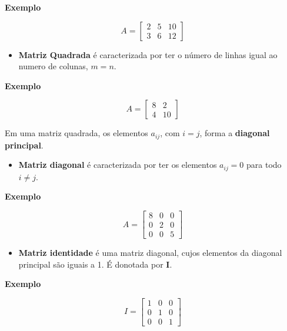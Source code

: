 \documentclass[
]{book}
\providecommand{\tightlist}{%
  \setlength{\itemsep}{0pt}\setlength{\parskip}{0pt}}
\begin{document}
\textbf{Exemplo}

\begin{equation*}
A = 
\begin{bmatrix}
2 & 5 & 10 \\
3 & 6 & 12
\end{bmatrix}
\end{equation*}

\begin{itemize}
\tightlist
\item
  \textbf{Matriz Quadrada} é caracterizada por ter o número de linhas igual ao numero de colunas, \(m = n\).
\end{itemize}

\textbf{Exemplo}

\begin{equation*}
A = 
\begin{bmatrix}
8 & 2 \\
4 & 10
\end{bmatrix}
\end{equation*}

Em uma matriz quadrada, os elementos \(a_{ij}\), com \(i = j\), forma a \textbf{diagonal principal}.

\begin{itemize}
\tightlist
\item
  \textbf{Matriz diagonal} é caracterizada por ter os elementos \(a_{ij} = 0\) para todo \(i \neq j\).
\end{itemize}

\textbf{Exemplo}

\begin{equation*}
A = 
\begin{bmatrix}
8 & 0 & 0\\
0 & 2 & 0\\
0 & 0 & 5
\end{bmatrix}
\end{equation*}

\begin{itemize}
\tightlist
\item
  \textbf{Matriz identidade} é uma matriz diagonal, cujos elementos da diagonal principal são iguais a 1. É donotada por \textbf{I}.
\end{itemize}

\textbf{Exemplo}

\begin{equation*}
I = 
\begin{bmatrix}
1 & 0 & 0\\
0 & 1 & 0\\
0 & 0 & 1
\end{bmatrix}
\end{equation*}
\end{document}
